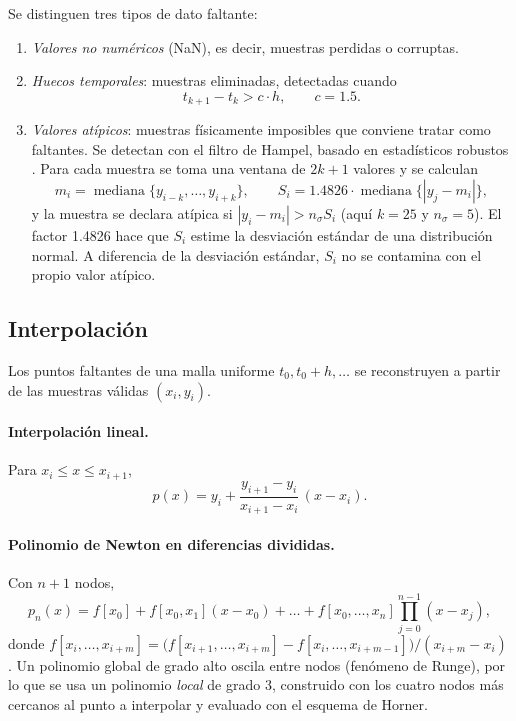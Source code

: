 Se distinguen tres tipos de dato faltante:
\begin{enumerate}
  \item \textit{Valores no numéricos} (NaN), es decir, muestras perdidas o corruptas.
  \item \textit{Huecos temporales}: muestras eliminadas, detectadas cuando
  \begin{equation}
    t_{k+1} - t_k > c \cdot h, \qquad c = 1.5 .
  \end{equation}
  \item \textit{Valores atípicos}: muestras físicamente imposibles que conviene tratar como faltantes. Se detectan con el filtro de Hampel, basado en estadísticos robustos \parencite{hampel1974}. Para cada muestra se toma una ventana de $2k+1$ valores y se calculan
  \begin{equation}
    m_i = \operatorname{mediana}\{y_{i-k},\dots,y_{i+k}\}, \qquad
    S_i = 1.4826 \cdot \operatorname{mediana}\{|y_j - m_i|\} ,
  \end{equation}
  y la muestra se declara atípica si $|y_i - m_i| > n_\sigma S_i$ (aquí $k = 25$ y $n_\sigma = 5$). El factor 1.4826 hace que $S_i$ estime la desviación estándar de una distribución normal. A diferencia de la desviación estándar, $S_i$ no se contamina con el propio valor atípico.
\end{enumerate}

\subsection{Interpolación}

Los puntos faltantes de una malla uniforme $t_0, t_0 + h, \dots$ se reconstruyen a partir de las muestras válidas $(x_i, y_i)$.

\paragraph{Interpolación lineal.} Para $x_i \le x \le x_{i+1}$,
\begin{equation}
  p(x) = y_i + \frac{y_{i+1} - y_i}{x_{i+1} - x_i}\,(x - x_i).
\end{equation}

\paragraph{Polinomio de Newton en diferencias divididas.} Con $n+1$ nodos,
\begin{equation}
  p_n(x) = f[x_0] + f[x_0,x_1](x - x_0) + \dots + f[x_0,\dots,x_n]\prod_{j=0}^{n-1}(x - x_j),
\end{equation}
donde $f[x_i,\dots,x_{i+m}] = \bigl(f[x_{i+1},\dots,x_{i+m}] - f[x_i,\dots,x_{i+m-1}]\bigr)/(x_{i+m} - x_i)$ \parencite{chapra2015}. Un polinomio global de grado alto oscila entre nodos (fenómeno de Runge), por lo que se usa un polinomio \emph{local} de grado 3, construido con los cuatro nodos más cercanos al punto a interpolar y evaluado con el esquema de Horner.

